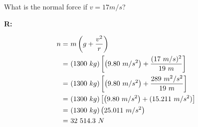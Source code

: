 		What is the normal force if $v = 17 m/s$?

		\textbf{R:} \newline

		\begin{align}
			n = \ &m\left(g + \frac{v^{2}}{r} \right)& \notag \\
			= \ &(1300 \ kg)\left[\left(9.80 \ m/s^{2}\right) + \frac{(17 \ m/s)^{2}}{19 \ m} \right]& \notag \\
			= \ &(1300 \ kg)\left[\left(9.80 \ m/s^{2}\right) + \frac{289 \ m^{2}/s^{2}}{19 \ m} \right]& \notag \\
			= \ &(1300 \ kg)\left[\left(9.80 \ m/s^{2}\right) + (15.211 \ m/s^{2}) \right]& \notag \\
			= \ &(1300 \ kg)\left(25.011 \ m/s^{2} \right)& \notag \\
			= \ &32 \ 514.3 \ N&
		\end{align}
